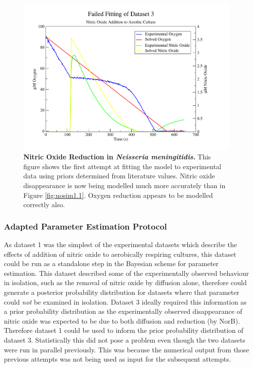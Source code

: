 \begin{figure}[tbp]
 \centering
 \includegraphics[width=15cm, trim=1cm 1cm 3cm 1cm, clip=true]{./06-noreduction/data/aer-no-sim3.pdf}
 \caption[{Nitric Oxide Reduction in \textit{Neisseria meningitidis}.}]{{\bf Nitric Oxide Reduction in \textit{Neisseria meningitidis}.} This figure shows the first attempt at fitting the model to experimental data using priors determined from literature values. Nitric oxide disappearance is now being modelled much more accurately than in Figure \ref{fig:nosim1.1}. Oxygen reduction appears to be modelled correctly also.}
 \label{fig:nosim3.1}
\end{figure}

\subsubsection{Adapted Parameter Estimation Protocol}

As dataset 1 was the simplest of the experimental datasets which describe the effects of addition of nitric oxide to aerobically respiring cultures, this dataset could be run as a standalone step in the Bayesian scheme for parameter estimation. This dataset described some of the experimentally observed behaviour in isolation, such as the removal of nitric oxide by diffusion alone, therefore could generate a posterior probability distribution for datasets where that parameter could \textit{not} be examined in isolation. Dataset 3 ideally required this information as a prior probability distribution as the experimentally observed disappearance of nitric oxide was expected to be due to both diffusion and reduction (by NorB). Therefore dataset 1 could be used to inform the prior probability distribution of dataset 3. Statistically this did not pose a problem even though the two datasets were run in parallel previously. This was because the numerical output from those previous attempts was not being used as input for the subsequent attempts.

